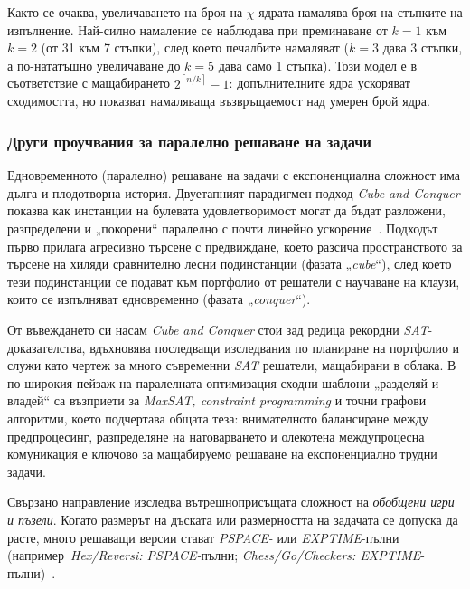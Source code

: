 Както се очаква, увеличаването на броя на \(\chi\)-ядрата намалява броя на стъпките на изпълнение.
Най-силно намаление се наблюдава при преминаване от \(k=1\) към \(k=2\) (от 31 към 7 стъпки), след което
печалбите намаляват (\(k=3\) дава 3 стъпки, а по-нататъшно увеличаване до \(k=5\) дава само 1 стъпка).
Този модел е в съответствие с мащабирането \(2^{\left\lceil n/k \right\rceil} - 1\): допълнителните ядра ускоряват
сходимостта, но показват намаляваща възвръщаемост над умерен брой ядра.


\subsubsection{Други проучвания за паралелно решаване на задачи} 

\hspace*{2.5em}Едновременното (паралелно) решаване на задачи с експоненциална сложност има дълга и плодотворна история. Двуетапният парадигмен подход \textit{Cube and Conquer} показва как инстанции на булевата удовлетворимост могат да бъдат разложени, разпределени и „покорени“ паралелно с почти линейно ускорение~\cite{Heule2012}. Подходът първо прилага агресивно търсене с предвиждане, което разсича пространството за търсене на хиляди сравнително лесни подинстанции (фазата „\textit{cube}“), след което тези подинстанции се подават към портфолио от решатели с научаване на клаузи, които се изпълняват едновременно (фазата „\textit{conquer}“).

От въвеждането си насам \textit{Cube and Conquer} стои зад редица рекордни \textit{SAT}-доказателства, вдъхновява последващи изследвания по планиране на портфолио и служи като чертеж за много съвременни \textit{SAT} решатели, мащабирани в облака. В по-широкия пейзаж на паралелната оптимизация сходни шаблони „разделяй и владей“ са възприети за \textit{MaxSAT, constraint programming} и точни графови алгоритми, което подчертава общата теза: внимателното балансиране между предпроцесинг, разпределяне на натоварването и олекотена междупроцесна комуникация е ключово за мащабируемо решаване на експоненциално трудни задачи.

Свързано направление изследва вътрешноприсъщата сложност на \emph{обобщени игри и пъзели}. Когато размерът на дъската или размерността на задачата се допуска да расте, много решаващи версии стават \textit{PSPACE-} или \textit{EXPTIME}-пълни (например\ \textit{Hex/Reversi: PSPACE-}пълни; \textit{Chess/Go/Checkers: EXPTIME}-пълни)~\cite{IwataKasai1994,Reisch1981,FraenkelLichtenstein1981,Robson1983,Robson1984}.

